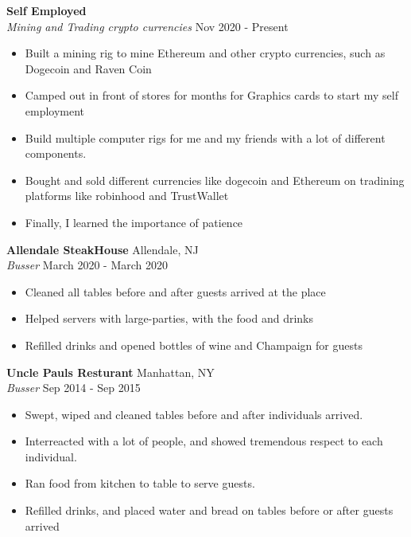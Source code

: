 \documentclass[a4paper]{article}
\begin{document}
\textbf{Self Employed}\\
\textit{Mining and Trading crypto currencies} \hfill Nov 2020 - Present\\
\vspace{-1mm}
\begin{itemize} \itemsep 1pt
	\item Built a mining rig to mine Ethereum and other crypto currencies, such as Dogecoin and Raven Coin
	\item Camped out in front of stores for months for Graphics cards to start my self employment
	\item Build multiple computer rigs for me and my friends with a lot of different components.
	\item Bought and sold different currencies like dogecoin and Ethereum on  tradining platforms like robinhood and TrustWallet
	\item Finally, I learned the importance of patience
\end{itemize}
\textbf{Allendale SteakHouse} \hfill Allendale, NJ\\
\textit{Busser} \hfill March 2020 - March 2020\\
\vspace{-1mm}
\begin{itemize} \itemsep 1pt
	\item Cleaned all tables before and after guests arrived at the place
	\item Helped servers with large-parties, with the food and drinks
	\item Refilled drinks and opened bottles of wine and Champaign for guests
\end{itemize}
\textbf{Uncle Paul\textquotesingle{}s Resturant} \hfill Manhattan, NY\\
\textit{Busser} \hfill Sep 2014 - Sep 2015\\
\vspace{-1mm}
\begin{itemize} \itemsep 1pt
	\item Swept, wiped and cleaned tables before and after individuals arrived.
	\item Interreacted with a lot of people, and showed tremendous respect to each individual.
	\item Ran food from kitchen to table to serve guests.
	\item Refilled drinks, and placed water and bread on tables before or after guests arrived
\end{itemize}
\end{document}

